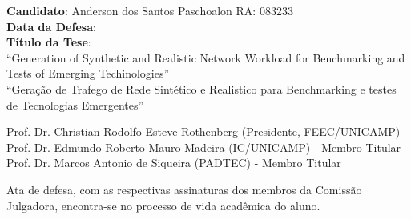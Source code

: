 \vspace{1cm}
\begin{flushleft}
\textbf{Candidato}: Anderson dos Santos Paschoalon \hspace{1cm}     RA: 083233 \\
\textbf{Data da Defesa}: \\
\textbf{Título da Tese}: \\
``Generation of Synthetic and Realistic Network Workload for Benchmarking and Tests of Emerging Techinologies''\\%
``Geração de Trafego de Rede Sintético e Realistico para Benchmarking e testes de Tecnologias Emergentes''%
\end{flushleft}
\vspace{0.2cm}
\begin{flushleft}Prof. Dr. Christian Rodolfo Esteve Rothenberg (Presidente, FEEC/UNICAMP)\\
Prof. Dr. Edmundo Roberto Mauro Madeira (IC/UNICAMP) - Membro Titular\\
Prof. Dr. Marcos Antonio de Siqueira (PADTEC) - Membro Titular
\end{flushleft}
\vspace{0.2cm} 
\begin{flushleft}Ata de defesa, com as respectivas assinaturas dos membros da Comissão Julgadora, encontra-se no processo de vida acadêmica do aluno. \end{flushleft}

